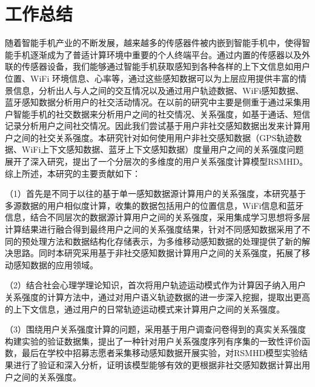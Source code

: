 \section{工作总结}
\label{sec:section6-1}
随着智能手机产业的不断发展，越来越多的传感器件被内嵌到智能手机中，使得智能手机逐渐成为了普适计算环境中重要的个人终端平台。通过内置的传感器以及外联的传感器设备，我们能够通过智能手机获取感知到各种各样的上下文信息如用户位置、WiFi 环境信息、心率等，通过这些感知数据可以为上层应用提供丰富的情景信息，分析出人与人之间的交互情况以及通过用户轨迹数据、WiFi感知数据、蓝牙感知数据分析用户的社交活动情况。在以前的研究中主要是侧重于通过采集用户智能手机的社交数据来分析用户之间的社交情况、关系强度，如基于通话、短信记录分析用户之间社交情况。因此我们尝试基于用户非社交感知数据出发来计算用户之间的社交关系强度。本研究针对如何使用用户非社交感知数据（GPS轨迹数据、WiFi上下文感知数据、蓝牙上下文感知数据）度量用户之间的关系强度问题展开了深入研究，提出了一个分层次的多维度的用户关系强度计算模型RSMHD。综上所述，本研究的主要贡献如下：
\par （1）首先是不同于以往的基于单一感知数据源计算用户的关系强度，本研究基于多源数据的用户相似度计算，收集的数据包括用户的位置信息，WiFi信息和蓝牙信息，结合不同层次的数据源计算用户之间的关系强度，采用集成学习思想将多层计算结果进行融合得到最终用户之间的关系强度结果，针对不同感知数据采用了不同的预处理方法和数据结构化存储表示，为多维移动感知数据的处理提供了新的解决思路。同时本研究采用基于非社交感知数据计算用户之间的关系强度，拓展了移动感知数据的应用领域。
\par （2）结合社会心理学理论知识，首次将用户轨迹运动模式作为计算因子纳入用户关系强度的计算方法中，通过对用户语义轨迹数据的进一步深入挖掘，提取出更高的上下文信息，通过用户的日常轨迹运动模式来计算用户之间的关系强度。
\par （3）围绕用户关系强度计算的问题，采用基于用户调查问卷得到的真实关系强度构建实验的验证数据集，提出了一种针对用户关系强度序列有序集的一致性评价函数，最后在学校中招募志愿者采集移动感知数据开展实验，对RSMHD模型实验结果进行了验证和深入分析，证明该模型能够有效的更根据非社交感知数据计算出用户之间的关系强度。

